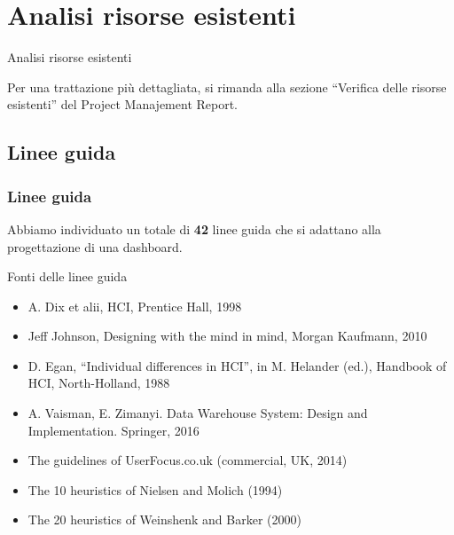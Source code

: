 \documentclass[handout]{beamer}
\begin{document}
	\section{Analisi risorse esistenti}
		\begin{frame}
			\centering
			\begin{Huge}
				Analisi risorse esistenti
			\end{Huge}
			\mbox{}
			\vfill
			\vspace*{100px}
			\begin{tiny}
				Per una trattazione più dettagliata, si rimanda alla sezione ``Verifica delle risorse esistenti'' del Project Manajement Report.
			\end{tiny}
		\end{frame}

		\subsection{Linee guida}

			\begin{frame}
	 			\frametitle{Linee guida}
				Abbiamo individuato un totale di \textbf{42} linee guida che si adattano alla progettazione di una dashboard.
				\begin{block}{Fonti delle linee guida}
					\begin{itemize}[<+->]
						\item A. Dix et alii, HCI, Prentice Hall, 1998\\
						\item Jeff Johnson, Designing with the mind in mind, Morgan Kaufmann, 2010\\
						\item D. Egan, “Individual differences in HCI”, in M. Helander (ed.), Handbook of HCI, North-Holland, 1988\\
						\item A. Vaisman, E. Zimanyi. Data Warehouse System: Design and Implementation. Springer, 2016\\
						\item The guidelines of UserFocus.co.uk (commercial, UK, 2014)\\
						\item The 10 heuristics of Nielsen and Molich (1994)\\
						\item The 20 heuristics of Weinshenk and Barker (2000)\\
					\end{itemize}
				\end{block}
			\end{frame}
		
\end{document}
